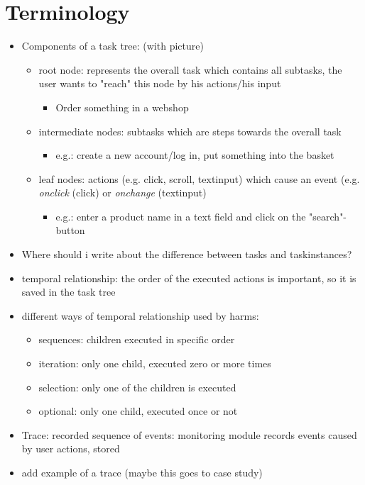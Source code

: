 \section{Terminology}
\begin{itemize} 
	\item Components of a task tree: (with picture)
	\begin{itemize}
		\item root node: represents the overall task which contains all subtasks, the user wants to "reach" this node by his actions/his input
		\begin{itemize}
    			\item Order something in a webshop
		\end{itemize}
		\item intermediate nodes: subtasks which are steps towards the overall task
		\begin{itemize}
			\item e.g.: create a new account/log in, put something into the basket
		\end{itemize}
		\item leaf nodes: actions (e.g. click, scroll, textinput) which cause an event (e.g. \textit{onclick} (click) or \textit{onchange} (textinput)
		\begin{itemize}
			\item e.g.: enter a product name in a text field and click on the "search"-button
		\end{itemize}
	\end{itemize}
	\item Where should i write about the difference between tasks and taskinstances? 	
	\item temporal relationship: the order of the executed actions is important, so it is saved in the task tree
	\item different ways of temporal relationship used by harms: 
	\begin{itemize}
		\item sequences: children executed in specific order
		\item iteration: only one child, executed zero or more times
		\item selection: only one of the children is executed
		\item optional:  only one child, executed once or not
	\end{itemize}	
	\item Trace: recorded sequence of events: monitoring module records events caused by user actions, stored 
	\item add example of a trace (maybe this goes to case study)
\end{itemize}

